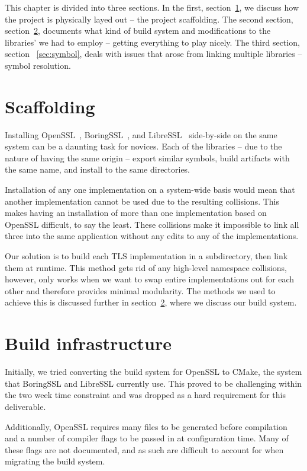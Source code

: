 \documentclass[12pt,oneside]{report}
\begin{document}
This chapter is divided into three sections. In the first,
section~\ref{sec:scaff}, we discuss how the project is physically layed out --
the project scaffolding. The second section, section~\ref{sec:build}, documents
what kind of build system and modifications to the libraries' we had to employ
-- getting everything to play nicely.  The third section, section
~\ref{sec:symbol}, deals with issues that arose from linking multiple libraries
-- symbol resolution.

\section{Scaffolding}
\label{sec:scaff}

Installing OpenSSL~\cite{website:openssl}, BoringSSL~\cite{website:boringssl},
and LibreSSL~\cite{website:libressl} side-by-side on the same system can be a
daunting task for novices. Each of the libraries -- due to the nature of having
the same origin -- export similar symbols, build artifacts with the same name,
and install to the same directories.

Installation of any one implementation on a system-wide basis would mean that
another implementation cannot be used due to the resulting collisions. This
makes having an installation of more than one implementation based on OpenSSL
difficult, to say the least. These collisions make it impossible to link all
three into the same application without any edits to any of the implementations.

Our solution is to build each TLS implementation in a subdirectory, then link
them at runtime. This method gets rid of any high-level namespace collisions,
however, only works when we want to swap entire implementations out for each
other and therefore provides minimal modularity. The methods we used to achieve
this is discussed further in section~\ref{sec:build}, where we discuss our build
system. 

\section{Build infrastructure}
\label{sec:build}

Initially, we tried converting the build system for OpenSSL to CMake, the system
that BoringSSL and LibreSSL currently use. This proved to be challenging within
the two week time constraint and was dropped as a hard requirement for this
deliverable.

Additionally, OpenSSL requires many files to be generated before compilation and
a number of compiler flags to be passed in at configuration time. Many of these
flags are not documented, and as such are difficult to account for when
migrating the build system.
\end{document}
